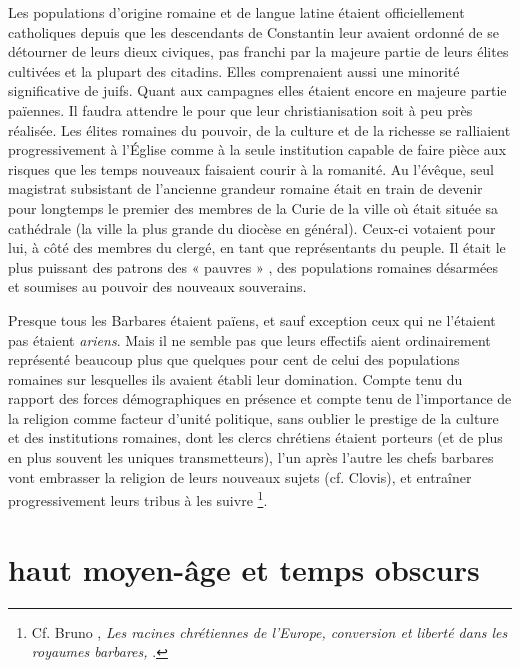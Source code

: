  Les populations d'origine romaine et de langue latine étaient officiellement catholiques depuis que les descendants de Constantin leur avaient ordonné de se détourner de leurs dieux civiques, pas franchi par la majeure partie de leurs élites cultivées et la plupart des citadins. Elles comprenaient aussi une minorité significative de juifs. Quant aux campagnes elles étaient encore en majeure partie païennes. Il faudra attendre le  pour que leur christianisation soit à peu près réalisée. Les élites romaines du pouvoir, de la culture et de la richesse se ralliaient progressivement à l’Église comme à la seule institution capable de faire pièce aux risques que les temps nouveaux faisaient courir à la romanité. Au  l'évêque, seul magistrat subsistant de l'ancienne grandeur romaine était en train de devenir pour longtemps le premier des membres de la Curie de la ville où était située sa cathédrale (la ville la plus grande du diocèse en général). Ceux-ci votaient pour lui, à côté des membres du clergé, en tant que représentants du peuple. Il était le plus puissant des patrons des « pauvres » , des populations romaines désarmées et soumises au pouvoir des nouveaux souverains. 

 Presque tous les Barbares étaient païens, et sauf exception ceux qui ne l'étaient pas étaient \emph{ariens}. Mais il ne semble pas que leurs effectifs aient ordinairement représenté beaucoup plus que quelques pour cent de celui des populations romaines sur lesquelles ils avaient établi leur domination. Compte tenu du rapport des forces démographiques en présence et compte tenu de l'importance de la religion comme facteur d'unité politique, sans oublier le prestige de la culture et des institutions romaines, dont les clercs chrétiens étaient porteurs (et de plus en plus souvent les uniques transmetteurs), l'un après l'autre les chefs barbares vont embrasser la religion de leurs nouveaux sujets (cf. Clovis), et entraîner progressivement leurs tribus à les suivre
\footnote{Cf. Bruno , \emph{Les racines chrétiennes de l'Europe, conversion et liberté dans les royaumes barbares, }.}. 


\section{haut moyen-âge et temps obscurs}

